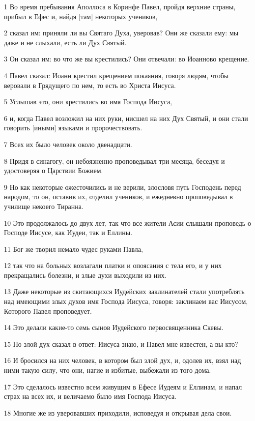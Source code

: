 \par 1 Во время пребывания Аполлоса в Коринфе Павел, пройдя верхние страны, прибыл в Ефес и, найдя [там] некоторых учеников,
\par 2 сказал им: приняли ли вы Святаго Духа, уверовав? Они же сказали ему: мы даже и не слыхали, есть ли Дух Святый.
\par 3 Он сказал им: во что же вы крестились? Они отвечали: во Иоанново крещение.
\par 4 Павел сказал: Иоанн крестил крещением покаяния, говоря людям, чтобы веровали в Грядущего по нем, то есть во Христа Иисуса.
\par 5 Услышав это, они крестились во имя Господа Иисуса,
\par 6 и, когда Павел возложил на них руки, нисшел на них Дух Святый, и они стали говорить [иными] языками и пророчествовать.
\par 7 Всех их было человек около двенадцати.
\par 8 Придя в синагогу, он небоязненно проповедывал три месяца, беседуя и удостоверяя о Царствии Божием.
\par 9 Но как некоторые ожесточились и не верили, злословя путь Господень перед народом, то он, оставив их, отделил учеников, и ежедневно проповедывал в училище некоего Тиранна.
\par 10 Это продолжалось до двух лет, так что все жители Асии слышали проповедь о Господе Иисусе, как Иудеи, так и Еллины.
\par 11 Бог же творил немало чудес руками Павла,
\par 12 так что на больных возлагали платки и опоясания с тела его, и у них прекращались болезни, и злые духи выходили из них.
\par 13 Даже некоторые из скитающихся Иудейских заклинателей стали употреблять над имеющими злых духов имя Господа Иисуса, говоря: заклинаем вас Иисусом, Которого Павел проповедует.
\par 14 Это делали какие-то семь сынов Иудейского первосвященника Скевы.
\par 15 Но злой дух сказал в ответ: Иисуса знаю, и Павел мне известен, а вы кто?
\par 16 И бросился на них человек, в котором был злой дух, и, одолев их, взял над ними такую силу, что они, нагие и избитые, выбежали из того дома.
\par 17 Это сделалось известно всем живущим в Ефесе Иудеям и Еллинам, и напал страх на всех их, и величаемо было имя Господа Иисуса.
\par 18 Многие же из уверовавших приходили, исповедуя и открывая дела свои.
